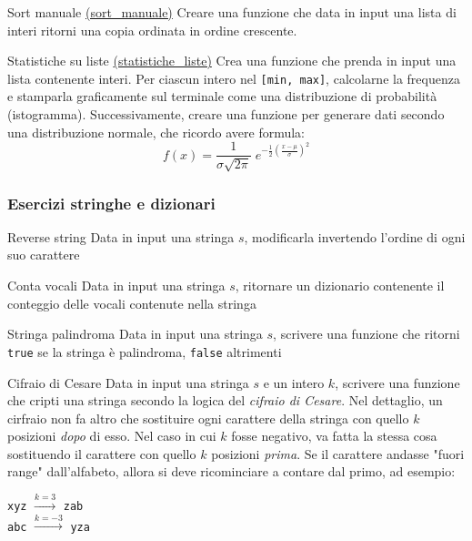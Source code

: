 \begin{esercizio}{Sort manuale \href{run:./files/python/unione_dizionari/}{(sort\_manuale)}}
	Creare una funzione che data in input una lista di interi ritorni una copia ordinata in ordine crescente.
\end{esercizio} \label{sort_manuale}

\begin{esercizio}{Statistiche su liste \href{run:./files/python/statistiche_liste/}{(statistiche\_liste)}}
	Crea una funzione che prenda in input una lista contenente interi. Per ciascun intero nel \verb|[min, max]|, calcolarne la frequenza e stamparla graficamente sul terminale come una distribuzione di probabilità (istogramma).
	\vskip3mm
	Successivamente, creare una funzione per generare dati secondo una distribuzione normale, che ricordo avere formula:
	\[
		f(x) = \frac{1}{\sigma \sqrt{2\pi}} \; e^{-\frac{1}{2} \left( \frac{x - \mu}{\sigma} \right)^2 }
	\]
\end{esercizio} \label{statistiche_liste}

\subsubsection{Esercizi stringhe e dizionari}
\begin{esercizio}{Reverse string}
	Data in input una stringa $ s $, modificarla invertendo l'ordine di ogni suo carattere
\end{esercizio}


\begin{esercizio}{Conta vocali}
	Data in input una stringa $ s $, ritornare un dizionario contenente il conteggio delle vocali contenute nella stringa
\end{esercizio}

\begin{esercizio}{Stringa palindroma}
	Data in input una stringa $ s $, scrivere una funzione che ritorni \verb|true| se la stringa è palindroma, \verb|false| altrimenti
\end{esercizio}

\begin{esercizio}{Cifraio di Cesare}
	Data in input una stringa $ s $ e un intero $ k $, scrivere una funzione che cripti una stringa secondo la logica del \textit{cifraio di Cesare}. Nel dettaglio, un cirfraio non fa altro che sostituire ogni carattere della stringa con quello $ k $ posizioni \textit{dopo} di esso. Nel caso in cui $ k $ fosse negativo, va fatta la stessa cosa sostituendo il carattere con quello $ k $ posizioni \textit{prima}. Se il carattere andasse "fuori range" dall'alfabeto, allora si deve ricominciare a contare dal primo, ad esempio:
	\begin{center}
		\verb|xyz| $ \xrightarrow{k=3} $ \verb|zab|\\
		\verb|abc| $ \xrightarrow{k=-3} $ \verb|yza|
	\end{center}
\end{esercizio}

